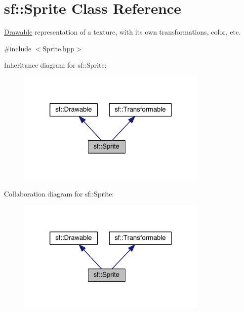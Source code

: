 \hypertarget{classsf_1_1_sprite}{\section{sf\-:\-:Sprite Class Reference}
\label{classsf_1_1_sprite}
}


\hyperlink{classsf_1_1_drawable}{Drawable} representation of a texture, with its own transformations, color, etc.  




{\ttfamily \#include $<$Sprite.\-hpp$>$}



Inheritance diagram for sf\-:\-:Sprite\-:
\nopagebreak
\begin{figure}[H]
\begin{center}
\leavevmode
\includegraphics[width=264pt]{classsf_1_1_sprite__inherit__graph}
\end{center}
\end{figure}


Collaboration diagram for sf\-:\-:Sprite\-:
\nopagebreak
\begin{figure}[H]
\begin{center}
\leavevmode
\includegraphics[width=264pt]{classsf_1_1_sprite__coll__graph}
\end{center}
\end{figure}
